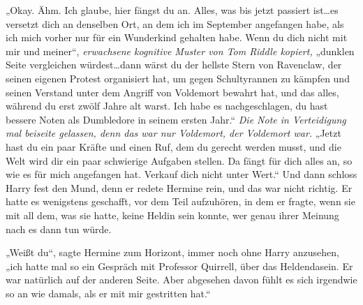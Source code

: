 „Okay. Ähm. Ich glaube, hier fängst du an. Alles, was bis jetzt passiert ist…es versetzt dich an denselben Ort, an dem ich im September angefangen habe, als ich mich vorher nur für ein Wunderkind gehalten habe. Wenn du dich nicht mit mir und meiner“, \emph{erwachsene kognitive Muster von Tom Riddle kopiert,} „dunklen Seite vergleichen würdest…dann wärst du der hellste Stern von Ravenclaw, der seinen eigenen Protest organisiert hat, um gegen Schultyrannen zu kämpfen und seinen Verstand unter dem Angriff von Voldemort bewahrt hat, und das alles, während du erst zwölf Jahre alt warst. Ich habe es nachgeschlagen, du hast bessere Noten als Dumbledore in seinem ersten Jahr.“ \emph{Die Note in Verteidigung mal beiseite gelassen, denn das war nur Voldemort, der Voldemort war.} „Jetzt hast du ein paar Kräfte und einen Ruf, dem du gerecht werden musst, und die Welt wird dir ein paar schwierige Aufgaben stellen. Da fängt für dich alles an, so wie es für mich angefangen hat. Verkauf dich nicht unter Wert.“ Und dann schloss Harry fest den Mund, denn er redete Hermine rein, und das war nicht richtig.
Er hatte es wenigstens geschafft, vor dem Teil aufzuhören, in dem er fragte, wenn sie mit all dem, was sie hatte, keine Heldin sein konnte, wer genau ihrer Meinung nach es dann tun würde.

„Weißt du“, sagte Hermine zum Horizont, immer noch ohne Harry anzusehen, „ich hatte mal so ein Gespräch mit Professor Quirrell, über das Heldendasein. Er war natürlich auf der anderen Seite. Aber abgesehen davon fühlt es sich irgendwie so an wie damals, als er mit mir gestritten hat.“

